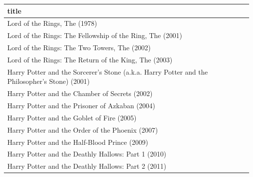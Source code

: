 \documentclass[]{article}
\begin{document}
\begin{longtable}[]{@{}l@{}}
\toprule
\begin{minipage}[b]{0.97\columnwidth}\raggedright
title\strut
\end{minipage}\tabularnewline
\midrule
\endhead
\begin{minipage}[t]{0.97\columnwidth}\raggedright
Lord of the Rings, The (1978)\strut
\end{minipage}\tabularnewline
\begin{minipage}[t]{0.97\columnwidth}\raggedright
Lord of the Rings: The Fellowship of the Ring, The (2001)\strut
\end{minipage}\tabularnewline
\begin{minipage}[t]{0.97\columnwidth}\raggedright
Lord of the Rings: The Two Towers, The (2002)\strut
\end{minipage}\tabularnewline
\begin{minipage}[t]{0.97\columnwidth}\raggedright
Lord of the Rings: The Return of the King, The (2003)\strut
\end{minipage}\tabularnewline
\begin{minipage}[t]{0.97\columnwidth}\raggedright
Harry Potter and the Sorcerer's Stone (a.k.a. Harry Potter and the
Philosopher's Stone) (2001)\strut
\end{minipage}\tabularnewline
\begin{minipage}[t]{0.97\columnwidth}\raggedright
Harry Potter and the Chamber of Secrets (2002)\strut
\end{minipage}\tabularnewline
\begin{minipage}[t]{0.97\columnwidth}\raggedright
Harry Potter and the Prisoner of Azkaban (2004)\strut
\end{minipage}\tabularnewline
\begin{minipage}[t]{0.97\columnwidth}\raggedright
Harry Potter and the Goblet of Fire (2005)\strut
\end{minipage}\tabularnewline
\begin{minipage}[t]{0.97\columnwidth}\raggedright
Harry Potter and the Order of the Phoenix (2007)\strut
\end{minipage}\tabularnewline
\begin{minipage}[t]{0.97\columnwidth}\raggedright
Harry Potter and the Half-Blood Prince (2009)\strut
\end{minipage}\tabularnewline
\begin{minipage}[t]{0.97\columnwidth}\raggedright
Harry Potter and the Deathly Hallows: Part 1 (2010)\strut
\end{minipage}\tabularnewline
\begin{minipage}[t]{0.97\columnwidth}\raggedright
Harry Potter and the Deathly Hallows: Part 2 (2011)\strut
\end{minipage}\tabularnewline
\bottomrule
\end{longtable}
\end{document}
